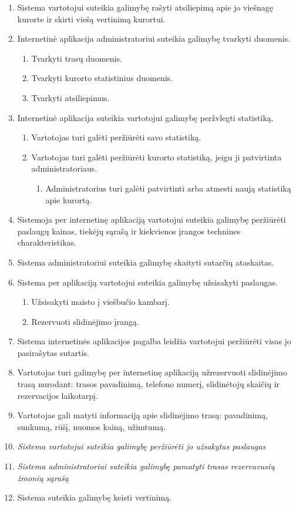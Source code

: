 \documentclass[oneside]{VUMIFPSkursinis}
\begin{document}
\begin{enumerate}
	\item Sistema vartotojui suteikia galimybę rašyti atsiliepimą apie jo viešnagę kurorte ir skirti viešą vertinimą kurortui.
	\item Internetinė aplikacija administratoriui suteikia galimybę tvarkyti duomenis.
	\begin{enumerate}
		\item Tvarkyti trasų duomenis.
		\item Tvarkyti kurorto statistinius duomenis.
		\item Tvarkyti atsiliepimus.
	\end{enumerate}
	\item Internetinė aplikacija suteikia vartotojui galimybę peržvlegti statistiką.
	\begin{enumerate}
		\item Vartotojas turi galėti peržiūrėti savo statistiką.
		\item Vartotojas turi galėti peržiūrėti kurorto statistiką, jeigu ji patvirtinta administratoriaus.
		\begin{enumerate}
			\item Administratorius turi galėti patvirtinti arba atmesti naują statistiką apie kurortą.
		\end{enumerate}
	\end{enumerate}
	\item Sistemoja per internetinę aplikaciją vartotojui suteikia galimybę peržiūrėti paslaugų kainas, tiekėjų sąrašą ir kiekvienos įrangos technines charakteristikas.
	\item Sistema administratoriui suteikia galimybę skaityti sutarčių ataskaitas.
	\item Sistema per aplikaciją vartotojui suteikia galimybę užsisakyti paslaugas.
	\begin{enumerate}
		\item Užsisakyti maisto į viešbučio kambarį.
		\item Rezervuoti slidinėjimo įrangą.
	\end{enumerate}
	\item Sistema internetinės aplikacijos pagalba leidžia vartotojui peržiūrėti visas jo pasirašytas sutartis.
	\item Vartotojas turi galimybę per internetinę aplikaciją užrezervuoti slidinėjimo trasą nurodant: trasos pavadinimą, telefono numerį, slidinėtojų skaičių ir rezervacijos laikotarpį.
	\item Vartotojas gali matyti informaciją apie slidinėjimo trasą: pavadinimą, sunkumą, rūšį, nuomos kainą, užimtumą.
	\item \textit{Sistema vartotojui suteikia galimybę peržiūrėti jo užsakytas paslaugas}
	\item \textit{Sistema administratoriui suteikia galimybę pamatyti trasas rezervavusių žmonių sąrašą}
	
	\item Sistema suteikia galimybę keisti vertinimą.
\end{enumerate}
\end{document}
